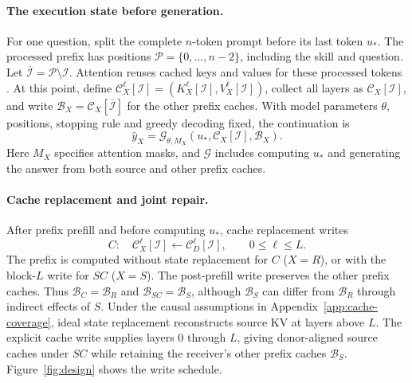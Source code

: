 \paragraph{The execution state before generation.}
For one question, split the complete $n$-token prompt before its last token
$u_*$. The processed prefix has positions $\mathcal P=\{0,\ldots,n-2\}$,
including the skill and question. Let
$\overline{\mathcal I}=\mathcal P\setminus\mathcal I$.
Attention reuses cached keys and values for these processed tokens
\citep{shazeer2019fast}. At this point, define
$\mathcal C_X^\ell[\mathcal I]=(K_X^\ell[\mathcal I],V_X^\ell[\mathcal I])$,
collect all layers as $\mathcal C_X[\mathcal I]$, and write
$\mathcal B_X=\mathcal C_X[\overline{\mathcal I}]$ for the other prefix
caches. With model parameters $\theta$, positions, stopping rule and
greedy decoding fixed, the continuation is
\begin{equation}
\hat y_X=\mathcal G_{\theta,M_X}
       (u_*,\mathcal C_X[\mathcal I],\mathcal B_X).
\label{eq:continuation}
\end{equation}
Here $M_X$ specifies attention masks, and $\mathcal G$ includes computing
$u_*$ and generating the answer from both source and other prefix caches.

\paragraph{Cache replacement and joint repair.}
After prefix prefill and before computing $u_*$, cache replacement writes
\begin{equation}
C:\quad \mathcal C_X^\ell[\mathcal I]
 \leftarrow\mathcal C_D^\ell[\mathcal I],\qquad 0\le\ell\le L.
\label{eq:cache}
\end{equation}
The prefix is computed without state replacement for $C$ ($X=R$), or
with the block-$L$ write for $SC$ ($X=S$). The post-prefill write preserves
the other prefix caches. Thus $\mathcal B_C=\mathcal B_R$ and
$\mathcal B_{SC}=\mathcal B_S$, although $\mathcal B_S$ can differ from
$\mathcal B_R$ through indirect effects of $S$.
Under the causal assumptions in Appendix~\ref{app:cache-coverage}, ideal
state replacement reconstructs source KV at layers above $L$. The explicit
cache write supplies layers $0$ through $L$, giving donor-aligned source
caches under $SC$ while retaining the receiver's other prefix caches
$\mathcal B_S$. Figure~\ref{fig:design} shows the write schedule.

